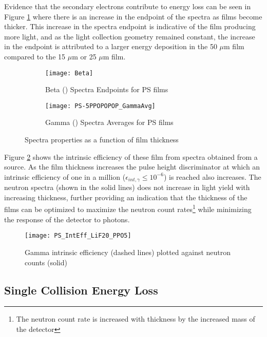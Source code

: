 Evidence that the secondary electrons contribute to energy loss can be seen in Figure \ref{fig:SpectraFeatures} where there is an increase in the endpoint of the spectra as films become thicker.
This increase in the spectra endpoint is indicative of the film producing more light, and as the light collection geometry remained constant, the increase in the endpoint is attributed to a larger energy deposition in the 50 $\mu$m film compared to the 15 $\mu$m or 25 $\mu$m film.
\begin{figure}[h]
    \centering
    \begin{subfigure}[b]{0.45\figurewidth}
        \texttt{[image: Beta]}
        \caption{Beta () Spectra Endpoints for PS films}
    \end{subfigure}
    \begin{subfigure}[b]{0.45\figurewidth}
        \texttt{[image: PS-5PPOPOPOP\_GammaAvg]}
        \caption{Gamma () Spectra Averages for PS films}
    \end{subfigure}
    \caption{Spectra properties as a function of film thickness}
    \label{fig:SpectraFeatures}
\end{figure}
Figure \ref{fig:GammaIntrNeutronCounts} shows the intrinsic efficiency of these film from spectra obtained from a  source.
As the film thickness increases the pulse height discriminator at which an intrinsic efficiency of one in a million ($\epsilon_{int,\gamma} \le 10^{-6}$) is reached also increases.
The neutron spectra (shown in the solid lines) does not increase in light yield with increasing thickness, further providing an indication that the thickness of the films can be optimized to maximize the neutron count rates\footnote{The neutron count rate is increased with thickness by the increased mass of the detector} while minimizing the response of the detector to photons.
\begin{figure}[ht]
    \centering
    \texttt{[image: PS\_IntEff\_LiF20\_PPO5]}
    \caption{Gamma intrinsic efficiency (dashed lines) plotted against neutron counts (solid)}
    \label{fig:GammaIntrNeutronCounts}
\end{figure}

\subsection{Single Collision Energy Loss}
\label{sec:SingleCollisionELoss}

